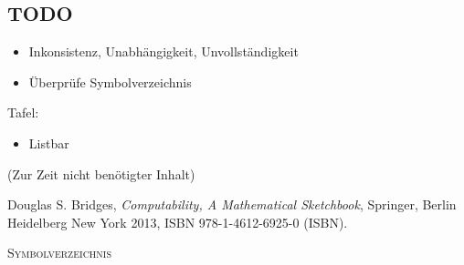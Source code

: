 \documentclass[a4paper]{amsart}
\theoremstyle{definition}
\begin{document}
\begin{backup}
\section{TODO}

\begin{itemize}
   \item Inkonsistenz, Unabhängigkeit, Unvollständigkeit
\end{itemize}

\begin{itemize}
     \item Überprüfe Symbolverzeichnis
\end{itemize}

Tafel:
\begin{itemize}
   \item Listbar
\end{itemize}

\end{backup}

\begin{backup}
    (Zur Zeit nicht benötigter Inhalt)
\end{backup}

\begin{thebibliography}{9}
   Douglas S. Bridges, \emph{Computability, A Mathematical Sketchbook},
   Springer, Berlin Heidelberg New York 2013, ISBN 978-1-4612-6925-0 (ISBN).

\end{thebibliography}

\begin{large}
    \centerline{\textsc{Symbolverzeichnis}}
\end{large}
\bigskip
\end{document}

